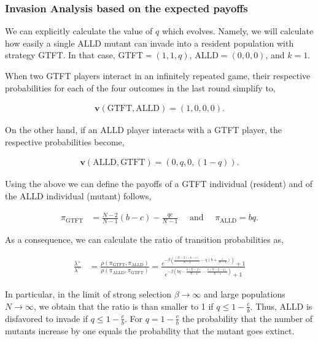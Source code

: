 \documentclass[11pt]{article}
\theoremstyle{plainCl1}
\theoremstyle{plainCl2}
\begin{document}
\subsubsection*{Invasion Analysis based on the expected payoffs}

We can explicitly calculate the value of \(q\) which evolves. Namely, we will
calculate how easily a single ALLD mutant can invade into a resident population
with strategy GTFT. In that case, GTFT\(= (1, 1, q)\), ALLD\(= (0, 0, 0)\), and
\(k = 1\).

When two GTFT players interact in an infinitely repeated game, their respective
probabilities for each of the four outcomes in the last round simplify to,

\begin{align*}
    \mathbf{v}(\text{GTFT}, \text{ALLD}) = (1, 0, 0, 0).
\end{align*}

On the other hand, if an ALLD player interacts with a GTFT player, the
respective probabilities become,

\begin{align*}
  \mathbf{v}(\text{ALLD}, \text{GTFT}) = (0, q, 0, (1 - q)).
\end{align*}

Using the above we can define the payoffs of a GTFT individual (resident)
and of the ALLD individual (mutant) follows,

\begin{align*}
  \displaystyle \pi_{\text{GTFT}} & = \displaystyle \frac{N\!-\!2}{N-1} (b - c)  -	\displaystyle\frac{q c}{N-1} \quad \text{ and } \quad \displaystyle \pi_{\text{ALLD}}  = \displaystyle b q.
\end{align*}

As a consequence, we can calculate the ratio of transition probabilities as,

\begin{align*}
    \frac{\lambda^{+}}{\lambda^{-}} & = \frac{\rho(\pi_{\text{GTFT}}, \pi_{\text{ALLD}})}{\rho(\pi_{\text{ALLD}}, \pi_{\text{GTFT}})}  = \frac{e^{-\beta \left(\frac{(N-2) (b-c)}{N-1} - q (b + \frac{c}{N-1})\right)}+1}
    {e^{-\beta\left(b q - \frac{b (N - 2)}{N-1} - \frac{c (N - 2 - q)}{N-1}\right)}+1}
\end{align*}

In particular, in the limit of strong selection \(\beta \rightarrow \infty\)
and large populations \(N \rightarrow \infty\), we obtain that the ratio is than
smaller to 1 if \(q \leq 1 - \frac{c}{b}\). Thus, ALLD is disfavored to invade
if \(q \leq 1 - \frac{c}{b}\). For \(q = 1 -\frac{c}{b}\) the probability that
the number of mutants increase by one equals the probability that the mutant
goes extinct.
\end{document}
